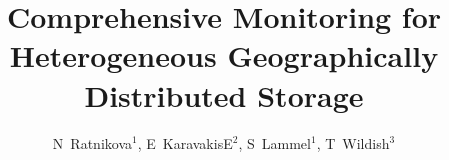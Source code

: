 \documentclass[a4paper]{jpconf}
\begin{document}
\title{Comprehensive Monitoring for Heterogeneous Geographically Distributed Storage}

\author{N~Ratnikova$^1$, E~KaravakisE$^2$, S~Lammel$^1$, T~Wildish$^3$}

\address{$^1$ Fermi National Accelerator Laboratory, US}
\address{$^2$ CERN, CH}
\address{$^3$ Princeton University, US}









% 
% 

\par

\end{document}
